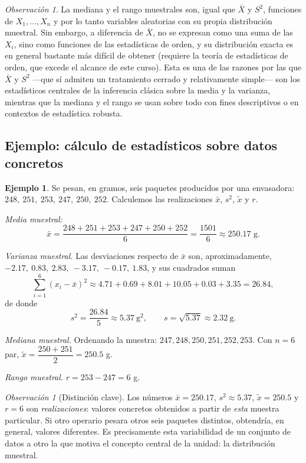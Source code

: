 \documentclass[11pt,a4paper]{article}
\theoremstyle{plain}
\theoremstyle{definition}
\newtheorem{ejemplo}[teorema]{Ejemplo}
\theoremstyle{remark}
\newtheorem{observacion}[teorema]{Observación}
\begin{document}
\begin{observacion}
La mediana y el rango muestrales son, igual que $\bar X$ y $S^2$, funciones de $X_1,\dots,X_n$ y por lo tanto variables aleatorias con su propia distribución muestral. Sin embargo, a diferencia de $\bar X$, no se expresan como una suma de las $X_i$, sino como funciones de las estadísticas de orden, y su distribución exacta es en general bastante más difícil de obtener (requiere la teoría de estadísticas de orden, que excede el alcance de este curso). Esta es una de las razones por las que $\bar X$ y $S^2$ —que sí admiten un tratamiento cerrado y relativamente simple— son los estadísticos centrales de la inferencia clásica sobre la media y la varianza, mientras que la mediana y el rango se usan sobre todo con fines descriptivos o en contextos de estadística robusta.
\end{observacion}

\subsection{Ejemplo: cálculo de estadísticos sobre datos concretos}

\begin{ejemplo}
Se pesan, en gramos, seis paquetes producidos por una envasadora: $248,\ 251,\ 253,\ 247,\ 250,\ 252$. Calculemos las realizaciones $\bar x$, $s^2$, $\tilde x$ y $r$.

\emph{Media muestral:}
$$\bar x = \frac{248+251+253+247+250+252}{6} = \frac{1501}{6} \approx 250.17 \text{ g}.$$

\emph{Varianza muestral.} Las desviaciones respecto de $\bar x$ son, aproximadamente, $-2.17,\ 0.83,\ 2.83,\ -3.17,\ -0.17,\ 1.83$, y sus cuadrados suman
$$\sum_{i=1}^{6}(x_i-\bar x)^2 \approx 4.71+0.69+8.01+10.05+0.03+3.35 = 26.84,$$
de donde
$$s^2 = \frac{26.84}{5} \approx 5.37 \ \text{g}^2, \qquad s = \sqrt{5.37}\approx 2.32 \ \text{g}.$$

\emph{Mediana muestral.} Ordenando la muestra: $247, 248, 250, 251, 252, 253$. Con $n=6$ par, $\tilde x = \dfrac{250+251}{2}=250.5$ g.

\emph{Rango muestral.} $r = 253 - 247 = 6$ g.
\end{ejemplo}

\begin{observacion}[Distinción clave]
Los números $\bar x = 250.17$, $s^2\approx 5.37$, $\tilde x = 250.5$ y $r=6$ son \emph{realizaciones}: valores concretos obtenidos a partir de \emph{esta} muestra particular. Si otro operario pesara otros seis paquetes distintos, obtendría, en general, valores diferentes. Es precisamente esta variabilidad de un conjunto de datos a otro la que motiva el concepto central de la unidad: la distribución muestral.
\end{observacion}
\end{document}
